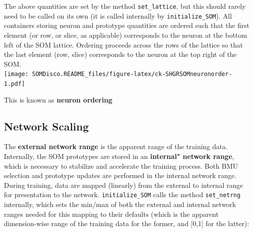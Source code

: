 \documentclass[]{article}
\newenvironment{Shaded}{\begin{snugshade}}{\end{snugshade}}
\newcommand{\CommentTok}[1]{\textcolor[rgb]{0.56,0.35,0.01}{\textit{#1}}}
\newcommand{\DecValTok}[1]{\textcolor[rgb]{0.00,0.00,0.81}{#1}}
\newcommand{\KeywordTok}[1]{\textcolor[rgb]{0.13,0.29,0.53}{\textbf{#1}}}
\newcommand{\NormalTok}[1]{#1}
\newcommand{\OperatorTok}[1]{\textcolor[rgb]{0.81,0.36,0.00}{\textbf{#1}}}
\begin{document}
\begin{Shaded}
\end{Shaded}

The above quantities are set by the method \texttt{set\_lattice}, but this should rarely need to be called on its own (it is called internally by \texttt{initialize\_SOM}). All containers storing neuron and prototype quantities are ordered such that the first element (or row, or slice, as applicable) corresponds to the neuron at the bottom left of the SOM lattice. Ordering proceeds across the rows of the lattice so that the last element (row, slice) corresponds to the neuron at the top right of the SOM.\\
\texttt{[image: SOMDisco.README\_files/figure-latex/ck-SHGRSOMneuronorder-1.pdf]}

This is known as \textbf{neuron ordering}

\hypertarget{network-scaling}{%
\subsection{Network Scaling}\label{network-scaling}}

The \textbf{external network range} is the apparent range of the training data. Internally, the SOM prototypes are stored in an \textbf{internal" network range}, which is necessary to stabilize and accelerate the training process. Both BMU selection and prototype updates are performed in the internal network range. During training, data are mapped (linearly) from the external to internal range for presentation to the network. \texttt{initialize\_SOM} calls the method \texttt{set\_netrng} internally, which sets the min/max of both the external and internal network ranges needed for this mapping to their defaults (which is the apparent dimension-wise range of the training data for the former, and {[}0,1{]} for the latter):
\end{document}
